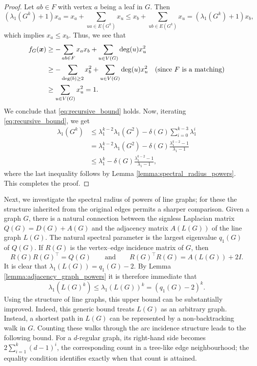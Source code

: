 \documentclass[10pt,a4paper]{article}
\theoremstyle{plain}
\numberwithin{equation}{section}
\def\x{\mbox{\boldmath $x$}}
\begin{document}
\begin{proof}
   Let $ab\in F$ with vertex $a$ being a leaf in $G$. Then 
   \[ (\lambda_1(G^k)+1)x_a = x_a + \sum_{ua \in E(G^k)} x_u \le x_b+\sum_{ub\in E(G^k)}x_u = (\lambda_1(G^k)+1)x_b,\]
   which implies $x_a\le x_b$. Thus, we see that 
   \begin{align*}
       f_G(\x) & \ge -\sum_{ab \in F}  x_ax_b + \sum_{u\in V(G)}\deg(u)x_u^2\\
       & \ge -\sum_{\deg(b)\ge 2}  x_b^2 + \sum_{u\in V(G)}\deg(u)x_u^2 \quad (\text{since $F$ is a matching})\\
       & \ge \sum_{u\in V(G)}x_u^2 = 1.
   \end{align*}
   We conclude that \eqref{eq:recursive_bound} holds. Now, iterating \eqref{eq:recursive_bound}, we get 
   \begin{align*}
       \lambda_1(G^k) & \le \lambda_1^{k-2}\lambda_1(G^2) - \delta(G)\sum_{i=0}^{k-3} \lambda_1^i \\
       & = \lambda_1^{k-2}\lambda_1(G^2) - \delta(G)\frac{\lambda_1^{k-2}-1}{\lambda_1-1}\\
       &\le \lambda_1^k - \delta(G)\frac{\lambda_1^{k-2}-1}{\lambda_1-1},
   \end{align*}
 where the last inequality follows by Lemma \ref{lemma:spectral_radius_powers}. This completes the proof.
\end{proof}

Next, we investigate the spectral radius of powers of line graphs; for these the structure inherited from the original edges permits a sharper comparison. Given a graph $G$, there is a natural connection between the signless Laplacian matrix $Q(G)=D(G)+A(G)$ and the adjacency matrix $A(L(G))$ of the line graph $L(G)$. The natural spectral parameter is the largest eigenvalue $q_1(G)$ of $Q(G)$. If $R(G)$ is the vertex--edge incidence matrix of $G$, then
\begin{equation}
    R(G)R(G)^\top = Q(G)\qquad \text{and}\qquad R(G)^\top R(G) = A(L(G)) + 2I.
\end{equation}
It is clear that $\lambda_1(L(G)) = q_1(G)-2$. By Lemma \ref{lemma:adjacency_graph_powers} it is therefore immediate that 
\begin{equation}
    \lambda_1(L(G)^k) \le \lambda_1(L(G))^k = (q_1(G)-2)^k.  
\end{equation}
Using the structure of line graphs, this upper bound can be substantially improved. Indeed, this generic bound treats $L(G)$ as an arbitrary graph. Instead, a shortest path in $L(G)$ can be represented by a non-backtracking walk in $G$. Counting these walks through the arc incidence structure leads to the following bound. For a $d$-regular graph, its right-hand side becomes $2\sum_{i=1}^k(d-1)^i$, the corresponding count in a tree-like edge neighbourhood; the equality condition identifies exactly when that count is attained.
\end{document}
